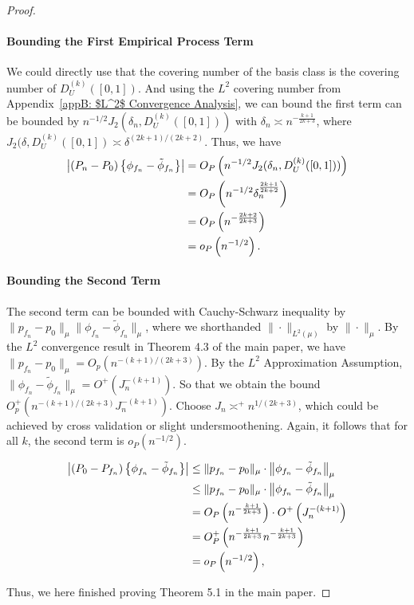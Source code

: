 \begin{proof}
\paragraph{Bounding the First Empirical Process Term}
We could directly use that the covering number of the basis class is the covering number of $D^{(k)}_U([0,1])$. And using the $L^2$ covering number from Appendix~\ref{appB: $L^2$ Convergence Analysis}, we can bound the first term can be bounded by $n^{-1/2}J_{2}(\delta_n,D^{(k)}_U([0,1]))$ with $\delta_n \asymp n^{-\frac{k+1}{2k+3}}$, where $J_{2}(\delta,D^{(k)}_U([0,1])\asymp\delta^{(2k+1)/(2k+2)}$. Thus, we have 
\begin{align*}
\left| (P_n - P_0)\left\{ \phi_{f_n} - \tilde{\phi}_{f_n} \right\} \right| 
&= O_P\left( n^{-1/2} J_2(\delta_n, D^{(k)}_U([0,1])) \right) \notag \\
&= O_P\left( n^{-1/2} \delta_n^{\frac{2k+1}{2k+2}} \right) \notag \\
&= O_P\left( n^{-\frac{2k+2}{2k+3}} \right) \notag \\
&= o_P\left( n^{-1/2} \right). 
\end{align*}

\paragraph{Bounding the Second Term}
The second term can be bounded with Cauchy-Schwarz inequality by $\| p_{f_n}-p_0\|_{\mu}\| \phi_{f_n}-\tilde{\phi}_{f_n}\|_{\mu}$, where we shorthanded $\|\cdot\|_{L^2(\mu)}$ by $\|\cdot\|_{\mu}$.
By the $L^2$ convergence result in Theorem 4.3 of the main paper, we have $\| p_{f_n}-p_0\|_{\mu}=O_p(n^{-(k+1)/(2k+3)})$. By the $L^2$ Approximation Assumption, $\| \phi_{f_n}-\tilde{\phi}_{f_n}\|_{\mu}= O^+(J_n^{-(k+1)})$. So that we obtain the bound $O_p^+(n^{-(k+1)/(2k+3)} J_n^{-(k+1)})$. Choose $J_n \asymp^+ n^{1/(2k+3)}$, which could be achieved by cross validation or slight undersmoothening. Again, it follows that for all $k$, the second term is $o_P(n^{-1/2})$. 

\begin{align*}
\left| (P_0 - P_{f_n})\left\{ \phi_{f_n} - \tilde{\phi}_{f_n} \right\} \right|
&\leq \| p_{f_n} - p_0 \|_{\mu} \cdot \left\| \phi_{f_n} - \tilde{\phi}_{f_n} \right\|_{\mu} \notag \\
&\leq \| p_{f_n} - p_0 \|_{\mu} \cdot \left\|\phi_{f_n} - \tilde{\phi}_{f_n} \right\|_{\mu} \notag \\
&= O_P\left( n^{-\frac{k+1}{2k+3}} \right) \cdot O^+\left( J_n^{-(k+1)} \right) \notag \\
&= O_P^+\left( n^{-\frac{k+1}{2k+3}} n^{-\frac{k+1}{2k+3}} \right) \notag \\
&= o_P\left( n^{-1/2} \right), \label{eq:mean-difference-bound}
\end{align*}

Thus, we here finished proving Theorem 5.1 in the main paper.
\end{proof}


